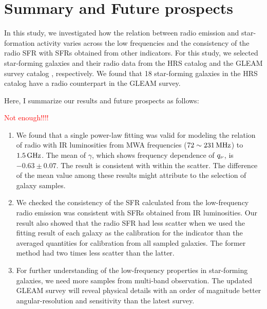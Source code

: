 \chapter{Summary and Future prospects}\label{chap:summary}
%
%

In this study, we investigated how the relation between radio emission and star-formation activity varies across the low frequencies and the consistency of the radio SFR with SFRs obtained from other indicators.
For this study, we selected star-forming galaxies and their radio data from the HRS catalog \citep{Boselli2010} and the GLEAM survey catalog \citep{Hurley-Walker2017a}, respectively.
We found that 18 star-forming galaxies in the HRS catalog have a radio counterpart in the GLEAM survey.

Here, I summarize our results and future prospects as follows:

\textcolor{red}{Not enough!!!!}
\begin{enumerate}
    \item We found that a single power-law fitting was valid for modeling the relation of radio with IR luminosities from MWA frequencies ($72 \sim 231\,\mathrm{MHz}$) to $1.5\,\mathrm{GHz}$.
        The mean of $\gamma$, which shows frequency dependence of $q_{\nu}$, is $-0.63 \pm 0.07$.
        The result is consistent with \citet{CalistroRivera2017a, Chyzy2018} within the scatter.
        The difference of the mean value among these results might attribute to the selection of galaxy samples.
    \item We checked the consistency of the SFR calculated from the low-frequency radio emission was consistent with SFRs obtained from IR luminosities.
        Our result also showed that the radio SFR had less scatter when we used the fitting result of each galaxy as the calibration for the indicator than the averaged quantities for calibration from all sampled galaxies.
        The former method had two times less scatter than the latter.
    \item For further understanding of the low-frequency properties in star-forming galaxies, we need more samples from multi-band observation.
        The updated GLEAM survey will reveal physical details with an order of magnitude better angular-resolution and sensitivity than the latest survey.
\end{enumerate}



